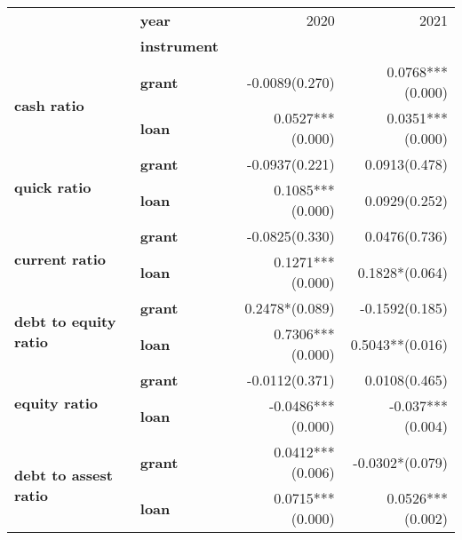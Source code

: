 \begin{tabular}{llrr}
\toprule
                     & \textbf{year} &                                    2020 &                                    2021 \\
{} & \textbf{instrument} &                                         &                                         \\
\midrule
\multirow{2}{*}{\textbf{cash ratio}} & \textbf{grant} &  -0.0089\space\space\space\space(0.270) &                  0.0768***\space(0.000) \\
                     & \textbf{loan} &                  0.0527***\space(0.000) &                  0.0351***\space(0.000) \\
\cline{1-4}
\multirow{2}{*}{\textbf{quick ratio}} & \textbf{grant} &  -0.0937\space\space\space\space(0.221) &   0.0913\space\space\space\space(0.478) \\
                     & \textbf{loan} &                  0.1085***\space(0.000) &   0.0929\space\space\space\space(0.252) \\
\cline{1-4}
\multirow{2}{*}{\textbf{current ratio}} & \textbf{grant} &  -0.0825\space\space\space\space(0.330) &   0.0476\space\space\space\space(0.736) \\
                     & \textbf{loan} &                  0.1271***\space(0.000) &        0.1828*\space\space\space(0.064) \\
\cline{1-4}
\multirow{2}{*}{\textbf{debt to equity ratio}} & \textbf{grant} &        0.2478*\space\space\space(0.089) &  -0.1592\space\space\space\space(0.185) \\
                     & \textbf{loan} &                  0.7306***\space(0.000) &             0.5043**\space\space(0.016) \\
\cline{1-4}
\multirow{2}{*}{\textbf{equity ratio}} & \textbf{grant} &  -0.0112\space\space\space\space(0.371) &   0.0108\space\space\space\space(0.465) \\
                     & \textbf{loan} &                 -0.0486***\space(0.000) &                  -0.037***\space(0.004) \\
\cline{1-4}
\multirow{2}{*}{\textbf{debt to assest ratio}} & \textbf{grant} &                  0.0412***\space(0.006) &       -0.0302*\space\space\space(0.079) \\
                     & \textbf{loan} &                  0.0715***\space(0.000) &                  0.0526***\space(0.002) \\
\bottomrule
\end{tabular}
